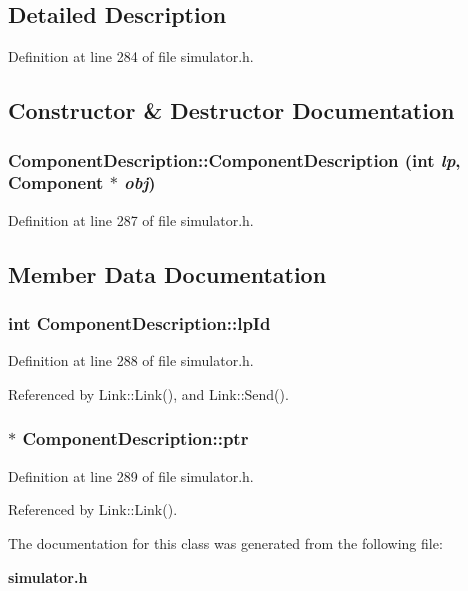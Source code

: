 \subsection{Detailed Description}


Definition at line 284 of file simulator.h.

\subsection{Constructor \& Destructor Documentation}
\subsubsection[{ComponentDescription}]{\setlength{\rightskip}{0pt plus 5cm}ComponentDescription::ComponentDescription (int {\em lp}, \/  {\bf Component} $\ast$ {\em obj})\hspace{0.3cm}{\tt  [inline]}}\label{classComponentDescription_ebcfce0c12f379fe3c7d19fc02a9751e}




Definition at line 287 of file simulator.h.

\subsection{Member Data Documentation}
\subsubsection[{lpId}]{\setlength{\rightskip}{0pt plus 5cm}int {\bf ComponentDescription::lpId}}\label{classComponentDescription_79464b7b6ee786c1396e33afa503292f}




Definition at line 288 of file simulator.h.

Referenced by Link::Link(), and Link::Send().
\subsubsection[{ptr}]{$\ast$ {\bf ComponentDescription::ptr}}\label{classComponentDescription_784cd2019b9d92de3206075c48aefdea}




Definition at line 289 of file simulator.h.

Referenced by Link::Link().

The documentation for this class was generated from the following file:\begin{CompactItemize}
\item 
{\bf simulator.h}\end{CompactItemize}
